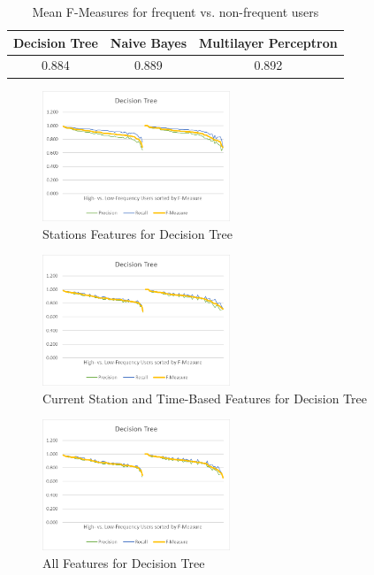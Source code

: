 \begin{table}[H]	
	\begin{center}
		\begin{tabular}{c | c | c}
			Decision Tree & Naive Bayes & Multilayer Perceptron \\
			\hline
			0.884  & 0.889 & 0.892 \\
		\end{tabular}
	\end{center}
	\caption{Mean F-Measures for frequent vs. non-frequent users}
	\label{table:f_measures_high_vs_low_frequency}
\end{table}

\begin{figure}[H]
	\centering
	\includegraphics[width=0.5\textwidth]{files/high_vs_low_frequency/decision_tree_stas}
	\caption{Stations Features for Decision Tree}
\end{figure}

\begin{figure}[H]
	\centering
	\includegraphics[width=0.5\textwidth]{files/high_vs_low_frequency/decision_tree_csta_ts}
	\caption{Current Station and Time-Based Features for Decision Tree}
\end{figure}

\begin{figure}[H]
	\centering
	\includegraphics[width=0.5\textwidth]{files/high_vs_low_frequency/decision_tree_all}
	\caption{All Features for Decision Tree}
\end{figure}



